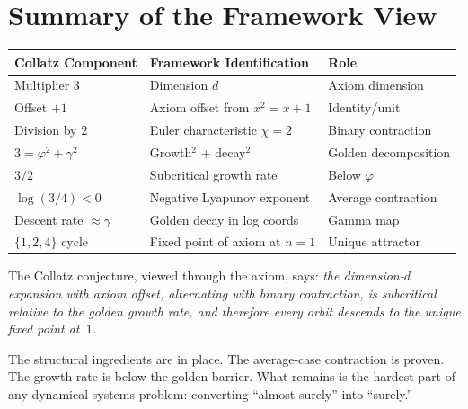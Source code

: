 \documentclass[11pt,a4paper]{article}
\theoremstyle{definition}
\newcommand{\gam}{\gamma}
\begin{document}
\section{Summary of the Framework View}\label{sec:summary}

\begin{center}
\renewcommand{\arraystretch}{1.3}
\begin{tabular}{lll}
  \toprule
  \textbf{Collatz Component} & \textbf{Framework Identification}
    & \textbf{Role} \\
  \midrule
  Multiplier $3$ & Dimension $d$ & Axiom dimension \\
  Offset $+1$ & Axiom offset from $x^2 = x + 1$ & Identity/unit \\
  Division by $2$ & Euler characteristic $\chi = 2$ & Binary contraction \\
  $3 = \varphi^2 + \gam^2$ & Growth$^2$ + decay$^2$ & Golden decomposition \\
  $3/2$ & Subcritical growth rate & Below $\varphi$ \\
  $\log(3/4) < 0$ & Negative Lyapunov exponent & Average contraction \\
  Descent rate $\approx \gam$ & Golden decay in log coords & Gamma map \\
  $\{1,2,4\}$ cycle & Fixed point of axiom at $n=1$ & Unique attractor \\
  \bottomrule
\end{tabular}
\end{center}

\medskip

The Collatz conjecture, viewed through the axiom, says: \emph{the
dimension-$d$ expansion with axiom offset, alternating with binary contraction,
is subcritical relative to the golden growth rate, and therefore every orbit
descends to the unique fixed point at~$1$.}

The structural ingredients are in place. The average-case contraction is
proven. The growth rate is below the golden barrier. What remains is the
hardest part of any dynamical-systems problem: converting ``almost surely''
into ``surely.''

\end{document}
